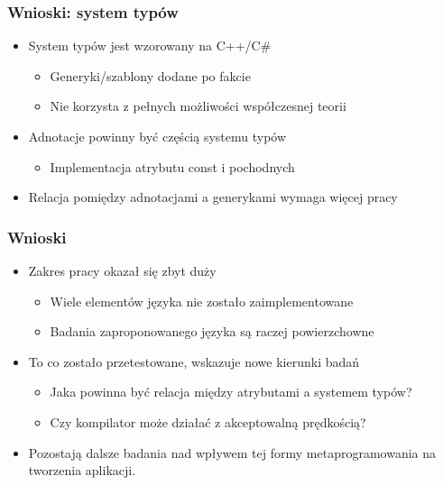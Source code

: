 \begin{frame}
	\frametitle{Wnioski: system typów}

	\begin{itemize}
		\item System typów jest wzorowany na C++/C\#\begin{itemize}
			\item Generyki/szablony dodane po fakcie
			\item Nie korzysta z pełnych możliwości współczesnej teorii
		\end{itemize}
		\item Adnotacje powinny być częścią systemu typów\begin{itemize}
			\item Implementacja atrybutu const i pochodnych
		\end{itemize}
		\item Relacja pomiędzy adnotacjami a generykami wymaga więcej pracy
	\end{itemize}

\end{frame}


\begin{frame}
	\frametitle{Wnioski}

	\begin{itemize}
		\item Zakres pracy okazał się zbyt duży\begin{itemize}
			\item Wiele elementów języka nie zostało zaimplementowane
			\item Badania zaproponowanego języka są raczej powierzchowne
		\end{itemize}
		\item To co zostało przetestowane, wskazuje nowe kierunki badań\begin{itemize}
			\item Jaka powinna być relacja między atrybutami a systemem typów?
			\item Czy kompilator może działać z akceptowalną prędkością?
		\end{itemize}
		\item Pozostają dalsze badania nad wpływem tej formy metaprogramowania na tworzenia aplikacji.
	\end{itemize}

\end{frame}

